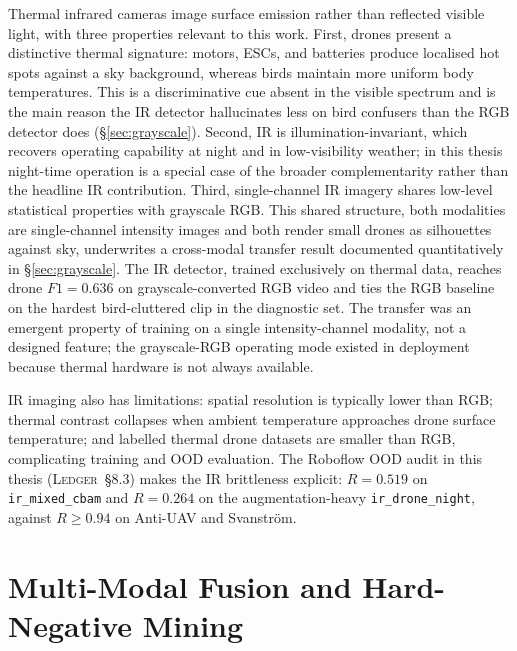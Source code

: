 \documentclass[12pt,a4paper,oneside,openright]{book}
\begin{document}
Thermal infrared cameras image surface emission rather than reflected visible light, with three properties relevant to this work. First, drones present a distinctive thermal signature: motors, ESCs, and batteries produce localised hot spots against a sky background, whereas birds maintain more uniform body temperatures. This is a discriminative cue absent in the visible spectrum and is the main reason the IR detector hallucinates less on bird confusers than the RGB detector does (\S\ref{sec:grayscale}). Second, IR is illumination-invariant, which recovers operating capability at night and in low-visibility weather; in this thesis night-time operation is a special case of the broader complementarity rather than the headline IR contribution. Third, single-channel IR imagery shares low-level statistical properties with grayscale RGB. This shared structure, both modalities are single-channel intensity images and both render small drones as silhouettes against sky, underwrites a cross-modal transfer result documented quantitatively in \S\ref{sec:grayscale}. The IR detector, trained exclusively on thermal data, reaches drone $F1=0.636$ on grayscale-converted RGB video and ties the RGB baseline on the hardest bird-cluttered clip in the diagnostic set. The transfer was an emergent property of training on a single intensity-channel modality, not a designed feature; the grayscale-RGB operating mode existed in deployment because thermal hardware is not always available.

IR imaging also has limitations: spatial resolution is typically lower than RGB; thermal contrast collapses when ambient temperature approaches drone surface temperature; and labelled thermal drone datasets are smaller than RGB, complicating training and OOD evaluation. The Roboflow OOD audit in this thesis (\textsc{Ledger}~\S8.3) makes the IR brittleness explicit: $R=0.519$ on \texttt{ir\_mixed\_cbam} and $R=0.264$ on the augmentation-heavy \texttt{ir\_drone\_night}, against $R\geq 0.94$ on Anti-UAV and Svanstr\"om.

\section{Multi-Modal Fusion and Hard-Negative Mining}
\label{sec:lit_fusion}
\end{document}
